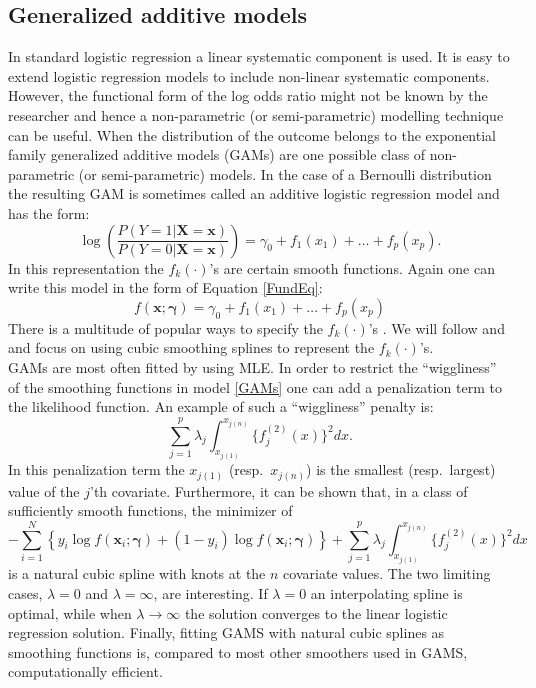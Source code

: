 \subsection{Generalized additive models}
\label{sec:GAM}
In standard logistic regression a linear systematic component is used. It is easy to extend logistic regression models to include non-linear systematic components. However, the functional form of the log odds ratio might not be known by the researcher and hence a non-parametric (or semi-parametric) modelling technique can be useful. When the distribution of the outcome belongs to the exponential family generalized additive models (GAMs) are one possible class of non-parametric (or semi-parametric) models. In the case of a Bernoulli distribution the resulting GAM is sometimes called an additive logistic regression model and has the form:
\begin{equation}
\label{GAMs}
\log \left( \frac{P(Y = 1|\bm{X} = \bm{x} )}{P(Y=0|\bm{X} = \bm{x})} \right) = \gamma_0 + f_1(x_{1}) + \dots + f_p(x_{p}).
\end{equation}
In this representation the $f_k(\cdot)$'s are certain smooth functions. Again one can write this model in the form of Equation \ref{FundEq}:
\[f(\bm{x};\bm{\gamma}) = \gamma_0 + f_1(x_{1}) + \dots + f_p(x_{p})\] 
There is a multitude of popular ways to specify the $f_k(\cdot)$'s \parencite{wood_generalized_2006, hastie_generalized_1990}. We will follow \cite{wood_generalized_2006} and \cite{wood_gams_2002} and focus on using cubic smoothing splines to represent the $f_k(\cdot)$'s. \\

GAMs are most often fitted by using MLE. In order to restrict the ``wiggliness'' of the smoothing functions in model \ref{GAMs} one can add a penalization term to the likelihood function. An example of such a ``wiggliness'' penalty is:
\[\sum_{j=1}^p \lambda_j \int_{x_{j(1)}}^{x_{j(n)}} \{f^{(2)}_j(x) \}^2dx.\]
In this penalization term the $x_{j(1)}$ (resp.\ $x_{j(n)}$) is the smallest (resp.\ largest) value of the $j$'th covariate. Furthermore, it can be shown that, in a class of sufficiently smooth functions, the minimizer of
\[- \sum_{i=1}^{N} \left\lbrace y_i \log{f(\bm{x}_i;\bm{\gamma})}  + (1-y_i)\log{f(\bm{x}_i;\bm{\gamma})} \right\rbrace + \sum_{j=1}^p \lambda_j \int_{x_{j(1)}}^{x_{j(n)}} \{f_j^{(2)}(x)\}^2 dx\]
is a natural cubic spline with knots at the $n$ covariate values. The two limiting cases, $\lambda = 0$ and $\lambda = \infty$, are interesting. If $\lambda = 0$ an interpolating spline is optimal, while when $\lambda \to \infty$ the solution converges to the linear logistic regression solution. Finally, fitting GAMS with natural cubic splines as smoothing functions is, compared to most other smoothers used in GAMS, computationally efficient.\\

